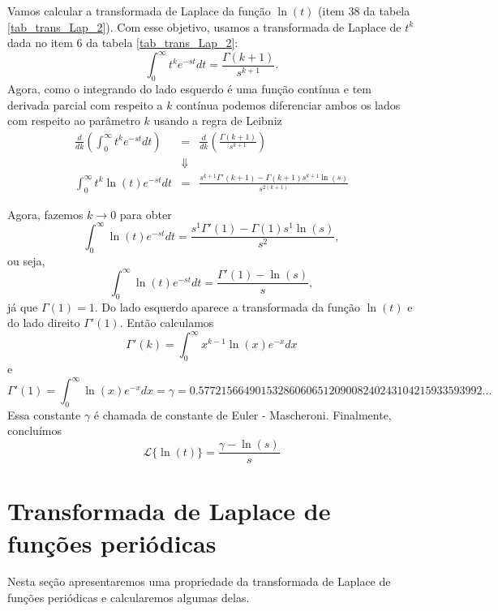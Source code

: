 \documentclass[Main.tex]{subfiles}
\begin{document}
\begin{ex}Vamos calcular a transformada de Laplace da função $\ln(t)$ (item 38 da tabela \ref{tab_trans_Lap_2}). Com esse objetivo, usamos a transformada de Laplace de $t^k$ dada no item 6 da tabela \ref{tab_trans_Lap_2}:
$$
\int_0^\infty t^ke^{-st}dt=\frac{\Gamma(k+1)}{s^{k+1}}.
$$
Agora, como o integrando do lado esquerdo é uma função contínua e tem derivada parcial com respeito a $k$ contínua podemos diferenciar ambos os lados com respeito ao parâmetro $k$ usando a regra de Leibniz
\begin{eqnarray*}
\frac{d}{dk}\left(\int_0^\infty t^ke^{-st}dt\right)&=&\frac{d}{dk}\left(\frac{\Gamma(k+1)}{s^{k+1}}\right)\\
&\Downarrow&\\
\int_0^\infty t^k \ln(t) e^{-st}dt&=&\frac{s^{k+1}\Gamma'(k+1)-\Gamma(k+1)s^{k+1}\ln(s)}{s^{2(k+1)}}
\end{eqnarray*}


Agora, fazemos $k\to 0$ para obter
$$
\int_0^\infty \ln(t) e^{-st}dt=\frac{s^{1}\Gamma'(1)-\Gamma(1)s^{1}\ln(s)}{s^{2}},
$$
ou seja,
$$
\int_0^\infty \ln(t) e^{-st}dt=\frac{\Gamma'(1)-\ln(s)}{s},
$$
já que $\Gamma(1)=1$. Do lado esquerdo aparece a transformada da função $\ln(t)$ e do lado direito $\Gamma'(1)$. Então calculamos
$$
\Gamma'(k)=\int_0^\infty x^{k-1}\ln(x) e^{-x}dx
$$
e
$$
\Gamma'(1)=\int_0^\infty \ln(x) e^{-x} dx=\gamma=0.57721566490153286060651209008240243104215933593992 ...
$$
Essa constante $\gamma$ é chamada de constante de Euler - Mascheroni. Finalmente, concluímos
$$
\mathcal{L}\{\ln(t)\}=\frac{\gamma-\ln(s)}{s}
$$

\end{ex}
 
 
 
\section{Transformada de Laplace de funções periódicas}
Nesta seção apresentaremos uma propriedade da transformada de Laplace de funções periódicas e calcularemos algumas delas.
\end{document}
